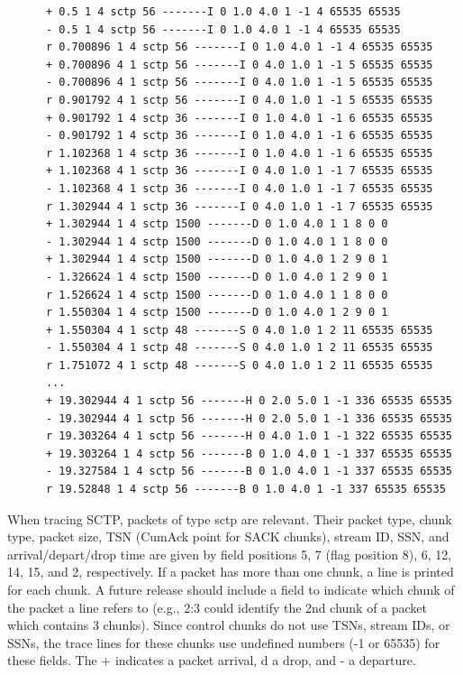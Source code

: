       \begin{verbatim}
      + 0.5 1 4 sctp 56 -------I 0 1.0 4.0 1 -1 4 65535 65535
      - 0.5 1 4 sctp 56 -------I 0 1.0 4.0 1 -1 4 65535 65535
      r 0.700896 1 4 sctp 56 -------I 0 1.0 4.0 1 -1 4 65535 65535
      + 0.700896 4 1 sctp 56 -------I 0 4.0 1.0 1 -1 5 65535 65535
      - 0.700896 4 1 sctp 56 -------I 0 4.0 1.0 1 -1 5 65535 65535
      r 0.901792 4 1 sctp 56 -------I 0 4.0 1.0 1 -1 5 65535 65535
      + 0.901792 1 4 sctp 36 -------I 0 1.0 4.0 1 -1 6 65535 65535
      - 0.901792 1 4 sctp 36 -------I 0 1.0 4.0 1 -1 6 65535 65535
      r 1.102368 1 4 sctp 36 -------I 0 1.0 4.0 1 -1 6 65535 65535
      + 1.102368 4 1 sctp 36 -------I 0 4.0 1.0 1 -1 7 65535 65535
      - 1.102368 4 1 sctp 36 -------I 0 4.0 1.0 1 -1 7 65535 65535
      r 1.302944 4 1 sctp 36 -------I 0 4.0 1.0 1 -1 7 65535 65535
      + 1.302944 1 4 sctp 1500 -------D 0 1.0 4.0 1 1 8 0 0
      - 1.302944 1 4 sctp 1500 -------D 0 1.0 4.0 1 1 8 0 0
      + 1.302944 1 4 sctp 1500 -------D 0 1.0 4.0 1 2 9 0 1
      - 1.326624 1 4 sctp 1500 -------D 0 1.0 4.0 1 2 9 0 1
      r 1.526624 1 4 sctp 1500 -------D 0 1.0 4.0 1 1 8 0 0
      r 1.550304 1 4 sctp 1500 -------D 0 1.0 4.0 1 2 9 0 1
      + 1.550304 4 1 sctp 48 -------S 0 4.0 1.0 1 2 11 65535 65535
      - 1.550304 4 1 sctp 48 -------S 0 4.0 1.0 1 2 11 65535 65535
      r 1.751072 4 1 sctp 48 -------S 0 4.0 1.0 1 2 11 65535 65535
      ...
      + 19.302944 4 1 sctp 56 -------H 0 2.0 5.0 1 -1 336 65535 65535
      - 19.302944 4 1 sctp 56 -------H 0 2.0 5.0 1 -1 336 65535 65535
      r 19.303264 4 1 sctp 56 -------H 0 4.0 1.0 1 -1 322 65535 65535
      + 19.303264 1 4 sctp 56 -------B 0 1.0 4.0 1 -1 337 65535 65535
      - 19.327584 1 4 sctp 56 -------B 0 1.0 4.0 1 -1 337 65535 65535
      r 19.52848 1 4 sctp 56 -------B 0 1.0 4.0 1 -1 337 65535 65535
      \end{verbatim}

      When tracing SCTP, packets of type {\sf sctp} are relevant.  Their
      packet type, chunk type, packet size, TSN (CumAck point for SACK
      chunks), stream ID, SSN, and arrival/depart/drop time are given by
      field positions 5, 7 (flag position 8), 6, 12, 14, 15, and 2,
      respectively. If a packet has more than one chunk, a line is printed
      for each chunk. A future release should include a field to indicate
      which chunk of the packet a line refers to (e.g., 2:3 could identify
      the 2nd chunk of a packet which contains 3 chunks). Since control
      chunks do not use TSNs, stream IDs, or SSNs, the trace lines for
      these chunks use undefined numbers (-1 or 65535) for these fields.
      The {\sf +} indicates a packet arrival, {\sf d} a drop, and {\sf -}
      a departure.

